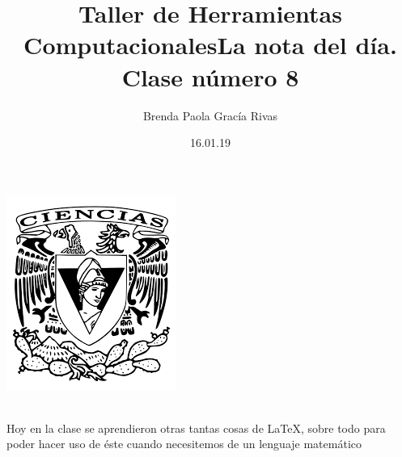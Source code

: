 \documentclass[letterpaper, 12pt, oneside]{article}
\title{\huge \color{brown}Taller de Herramientas Computacionales}
\author{Brenda Paola Gracía Rivas}
\date{16.01.19}
\begin{document}
	\maketitle
	\begin{center}
		\includegraphics[scale=1.0]{1.png}
	\end{center}
	\newpage
	\title{\huge La nota del día. Clase número 8}\\
	
	Hoy en la clase se aprendieron otras tantas cosas de LaTeX, sobre todo para poder hacer uso de éste cuando necesitemos de un lenguaje matemático 
	
\end{document}
